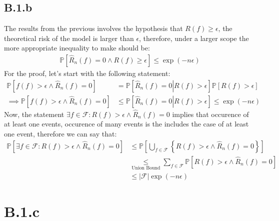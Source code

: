 \documentclass[]{article}
\begin{document}
    \subsection*{B.1.b}    
        The results from the previous involves the hypothesis that $R(f)\ge \epsilon$, the theoretical risk of the model is larger than $\epsilon$, therefore, under a larger scope the more appropriate inequality to make should be: 
        \begin{align*}\tag{B.1.b.1}\label{eqn:B.1.b.1}
            \mathbb{P}\left[
                \hat{R}_n(f) = 0\wedge R(f) \ge \epsilon
            \right] \le \exp(-n\epsilon)
        \end{align*}
        For the proof, let's start with the following statement: 
        \begin{align*}\tag{B.1.b.2}\label{eqn:B.1.b.2}
            \mathbb{P}\left[
                f(f) > \epsilon \wedge \hat{R}_n(f) = 0
            \right] &= 
            \mathbb{P}\left[\left.
                \hat{R}_n(f) = 0 \right|R(f) > \epsilon
            \right]\mathbb{P}\left[
                R(f)> \epsilon
            \right]
            \\
            \implies \mathbb{P}\left[
                f(f) > \epsilon \wedge \hat{R}_n(f) = 0
            \right]&\le \mathbb{P}\left[\left.
                \hat{R}_n(f) = 0 \right|R(f) > \epsilon
            \right] \le \exp(-n\epsilon)
        \end{align*}
        Now, the statement $\exists f\in \mathcal{F}: R(f)> \epsilon \wedge \hat{R}_n(f) = 0$ implies that occurence of at least one events, occurence of many events is the includes the case of at least one event, therefore we can say that: 
        \begin{align*}\tag{B.1.b.3}\label{eqn:B.1.b.3}
            \mathbb{P}\left[
                \exists f \in \mathcal{F}: R(f) > \epsilon \wedge \hat{R}_n(f) = 0 
            \right] 
            &\le 
            \mathbb{P}\left[
                \bigcup_{f\in \mathcal{F}} \left\lbrace 
                R(f) > \epsilon \wedge \hat{R}_n(f) = 0
                \right\rbrace
            \right]
            \\
            &\underset{\text{Union Bound}}{\le}
            \sum_{f\in \mathcal{F}}^{}
            \mathbb{P}\left[
                R(f) > \epsilon \wedge \hat{R}_n(f) = 0
            \right]
            \\
            &\le\left|
                \mathcal{F}
            \right|\exp(-n\epsilon)
        \end{align*}
    \section*{B.1.c}
        
\end{document}
